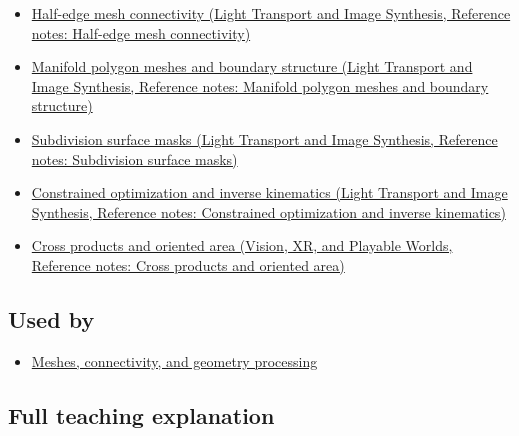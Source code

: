 \hypertarget{appendix-7107009c505b-prerequisites}{}

\begin{itemize}
\tightlist
\item
  \href{../04-Light-Transport-and-Image-Synthesis/main.pdf\#nameddest=appendix-1aea26b2307f}{Half-edge mesh connectivity (Light Transport and Image Synthesis, Reference notes: Half-edge mesh connectivity)}
\item
  \href{../04-Light-Transport-and-Image-Synthesis/main.pdf\#nameddest=appendix-fab348609369}{Manifold polygon meshes and boundary structure (Light Transport and Image Synthesis, Reference notes: Manifold polygon meshes and boundary structure)}
\item
  \href{../04-Light-Transport-and-Image-Synthesis/main.pdf\#nameddest=appendix-0234ab7f86b1}{Subdivision surface masks (Light Transport and Image Synthesis, Reference notes: Subdivision surface masks)}
\item
  \href{../04-Light-Transport-and-Image-Synthesis/main.pdf\#nameddest=appendix-29f4bea4c2bb}{Constrained optimization and inverse kinematics (Light Transport and Image Synthesis, Reference notes: Constrained optimization and inverse kinematics)}
\item
  \href{../07-Vision-XR-and-Playable-Worlds/main.pdf\#nameddest=appendix-2391db8052b1}{Cross products and oriented area (Vision, XR, and Playable Worlds, Reference notes: Cross products and oriented area)}
\end{itemize}

\subsection{Used by}\label{appendix-7107009c505b-used-by}

\hypertarget{appendix-7107009c505b-used-by}{}

\begin{itemize}
\tightlist
\item
  \hyperref[03-visual-computing-i-ch002-meshes-connectivity-and-geometry-processing]{Meshes, connectivity, and geometry processing}
\end{itemize}

\subsection{Full teaching explanation}\label{appendix-7107009c505b-full-teaching-explanation}

\hypertarget{appendix-7107009c505b-full-teaching-explanation}{}

